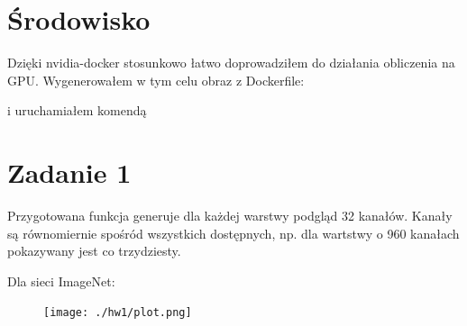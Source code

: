 \section{Środowisko}\label{ux15brodowisko}

Dzięki nvidia-docker stosunkowo łatwo doprowadziłem do działania
obliczenia na GPU. Wygenerowałem w tym celu obraz z Dockerfile:

\begin{Shaded}
\begin{Highlighting}[]




\end{Highlighting}
\end{Shaded}

i uruchamiałem komendą

\begin{Shaded}
\begin{Highlighting}[]
\VariableTok{$(}\VariableTok{)}\NormalTok{:}\VariableTok{$(}\VariableTok{)}\VariableTok{$(}\VariableTok{)}\VariableTok{$(}\VariableTok{)}\NormalTok{:}\VariableTok{$(}\VariableTok{)}
\end{Highlighting}
\end{Shaded}

\section{Zadanie 1}\label{zadanie-1}

Przygotowana funkcja generuje dla każdej warstwy podgląd 32 kanałów.
Kanały są równomiernie spośród wszystkich dostępnych, np. dla wartstwy o
960 kanałach pokazywany jest co trzydziesty.

Dla sieci ImageNet:

\begin{figure}
\centering
\texttt{[image: ./hw1/plot.png]}
\caption{}
\end{figure}

